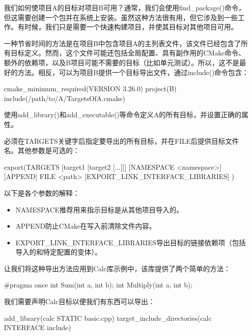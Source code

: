 我们如何使项目A的目标对项目B可用？通常，我们会使用find\_package()命令，但这需要创建一个包并在系统上安装。虽然这种方法很有用，但它涉及到一些工作。有时候，我们只是需要一个快速构建项目，并使其目标对其他项目可用。

一种节省时间的方法是在项目B中包含项目A的主列表文件，该文件已经包含了所有目标定义。然而，这个文件可能还包括全局配置、具有副作用的CMake命令、额外的依赖项，以及B项目可能不需要的目标（比如单元测试）。所以，这不是最好的方法。相反，可以为项目B提供一个目标导出文件，通过include()命令包含：

\begin{cmake}
cmake_minimum_required(VERSION 3.26.0)
project(B)
include(/path/to/A/TargetsOfA.cmake)
\end{cmake}

使用add\_library()和add\_executable()等命令定义A的所有目标，并设置正确的属性。

必须在TARGETS关键字后指定要导出的所有目标，并在FILE后提供目标文件名。其他参数是可选的：

\begin{shell}
export(TARGETS [target1 [target2 [...]]]
       [NAMESPACE <namespace>] [APPEND] FILE <path>
       [EXPORT_LINK_INTERFACE_LIBRARIES]
)
\end{shell}

以下是各个参数的解释：

\begin{itemize}
\item
NAMESPACE推荐用来指示目标是从其他项目导入的。

\item
APPEND防止CMake在写入前清除文件内容。

\item
EXPORT\_LINK\_INTERFACE\_LIBRARIES导出目标的链接依赖项（包括导入的和特定配置的变体）。
\end{itemize}

让我们将这种导出方法应用到Calc库示例中，该库提供了两个简单的方法：


\begin{cpp}
#pragma once
int Sum(int a, int b);
int Multiply(int a, int b);
\end{cpp}

我们需要声明Calc目标以便我们有东西可以导出：


\begin{cmake}
add_library(calc STATIC basic.cpp)
target_include_directories(calc INTERFACE include)
\end{cmake}

